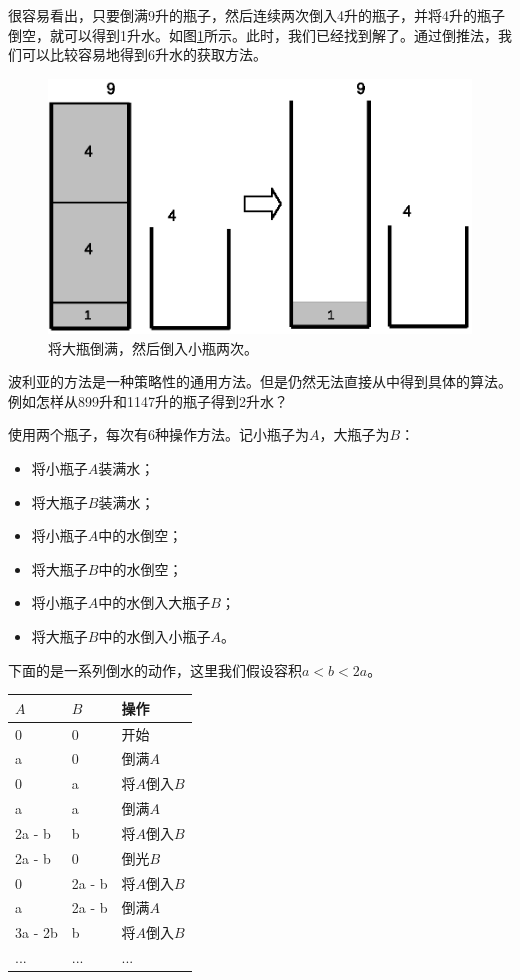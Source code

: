 \documentclass[UTF8]{article}
\begin{document}
很容易看出，只要倒满9升的瓶子，然后连续两次倒入4升的瓶子，并将4升的瓶子倒空，就可以得到1升水。如图\ref{fig:jugs-r2}所示。此时，我们已经找到解了。通过倒推法，我们可以比较容易地得到6升水的获取方法。

\begin{figure}[htbp]
 \centering
 \includegraphics[scale=0.5]{img/jugs-r2.eps}
 \caption{将大瓶倒满，然后倒入小瓶两次。}
 \label{fig:jugs-r2}
\end{figure}

波利亚的方法是一种策略性的通用方法。但是仍然无法直接从中得到具体的算法。例如怎样从899升和1147升的瓶子得到2升水？

使用两个瓶子，每次有6种操作方法。记小瓶子为$A$，大瓶子为$B$：

\begin{itemize}
\item 将小瓶子$A$装满水；
\item 将大瓶子$B$装满水；
\item 将小瓶子$A$中的水倒空；
\item 将大瓶子$B$中的水倒空；
\item 将小瓶子$A$中的水倒入大瓶子$B$；
\item 将大瓶子$B$中的水倒入小瓶子$A$。
\end{itemize}

下面的是一系列倒水的动作，这里我们假设容积$a < b < 2a$。

\begin{tabular}{l|l|l}
$A$ & $B$ & 操作 \\
\hline
0 & 0 & 开始 \\
a & 0 & 倒满$A$ \\
0 & a & 将$A$倒入$B$ \\
a & a & 倒满$A$ \\
2a - b & b & 将$A$倒入$B$ \\
2a - b & 0 & 倒光$B$ \\
0 & 2a - b & 将$A$倒入$B$ \\
a & 2a - b & 倒满$A$ \\
3a - 2b & b & 将$A$倒入$B$ \\
... & ... & ... \\
\end{tabular}
\end{document}
